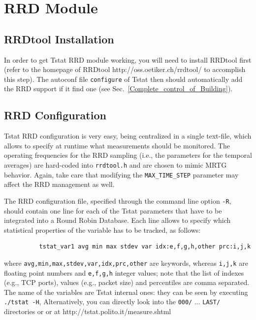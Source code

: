 \documentclass[11pt]{article}
\begin{document}
\section{RRD Module\label{RRD_Module}}
\subsection{RRDtool Installation\label{RRDtool_Installation}}


In order to get Tstat RRD module working, you will need to install RRDtool first
(refer to the homepage of RRDtool \textsf{http://oss.oetiker.ch/rrdtool/}  to accomplish this step).
The autoconf file \texttt{configure} of Tstat then should automatically add the RRD support 
if it find one (see Sec.~\ref{Complete_control_of_Building}).

\subsection{RRD Configuration\label{RRD_Configuration}}


Tstat RRD configuration is very easy, being centralized
in a single text-file, which allows to specify at runtime what measurements
should be monitored. The operating frequencies
for the RRD sampling (i.e., the parameters for the temporal 
averages) are hard-coded into \texttt{rrdtool.h} and are chosen to 
mimic MRTG behavior. Again, take care that modifying the \texttt{MAX\_TIME\_STEP}
parameter may affect the RRD management as well.



The RRD configuration file, specified through the command line option \texttt{-R},
should contain one line for each of the Tstat parameters that have
to be integrated into a Round Robin Database. Each line allows to
specify which statistical properties of the variable has to be tracked,
as follows:

\begin{small}\begin{verbatim}
          tstat_var1 avg min max stdev var idx:e,f,g,h,other prc:i,j,k
\end{verbatim}\end{small} \noindent
where \texttt{avg,min,max,stdev,var,idx,prc,other} are keywords, whereas \texttt{i,j,k} 
are floating point numbers and \texttt{e,f,g,h} integer values; note that
the list of indexes (e.g., TCP ports), values (e.g., packet size)
and percentiles are comma separated. The name of the variables are
Tstat internal ones: they can be seen by executing \texttt{./tstat -H},
Alternatively, you can directly look into the \texttt{000/} ...  \texttt{LAST/}  directories or
or at \textsf{http://tstat.polito.it/measure.shtml}
\end{document}
